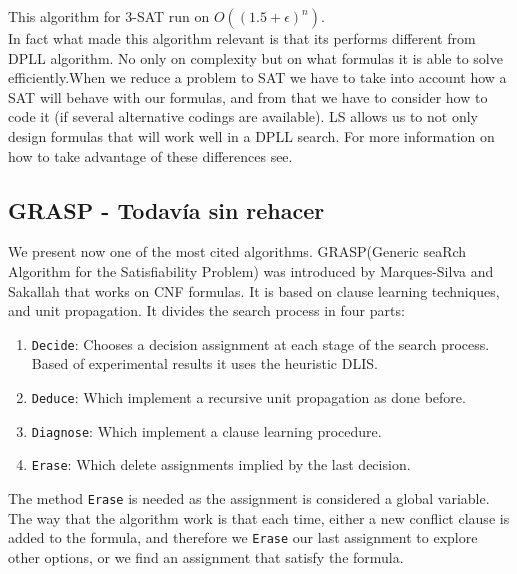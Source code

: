 This algorithm for $3$-SAT run on $O((1.5 + \epsilon)^n)$\cite{dantsin2000deterministic}.\\


In fact what made this algorithm relevant is that its performs different from DPLL algorithm. No only on complexity but on what formulas it is able to solve efficiently.When we reduce a problem to SAT we have to take into account how a SAT will behave with our formulas, and from that we have to consider how to code it (if several alternative codings are available). LS allows us to not only design formulas that will work well in a DPLL search. For more information on how to take advantage of these differences see\cite{gomes2009exploiting}.
  
\subsection{GRASP - Todavía sin rehacer }
\label{sub:grasp}
We present now one of the most cited algorithms.  GRASP(Generic seaRch Algorithm for the Satisfiability Problem) was introduced by Marques-Silva and Sakallah\cite{marques1999grasp} that works on CNF formulas. It is based on clause learning techniques, and unit propagation. It divides the search process in four parts:

\begin{enumerate}
\item \texttt{Decide}: Chooses a decision assignment at each stage of the search process. Based of experimental results it uses the heuristic DLIS.
\item \texttt{Deduce}: Which implement a recursive unit propagation as done before.
\item \texttt{Diagnose}: Which implement a clause learning procedure.
\item \texttt{Erase}: Which delete assignments implied by the last decision.
\end{enumerate}


The method \texttt{Erase} is needed as the assignment is considered a global variable. The way that the algorithm work is that each time, either a new conflict clause is added to the formula, and therefore we \texttt{Erase} our last assignment to explore other options, or we find an assignment that satisfy the formula.




